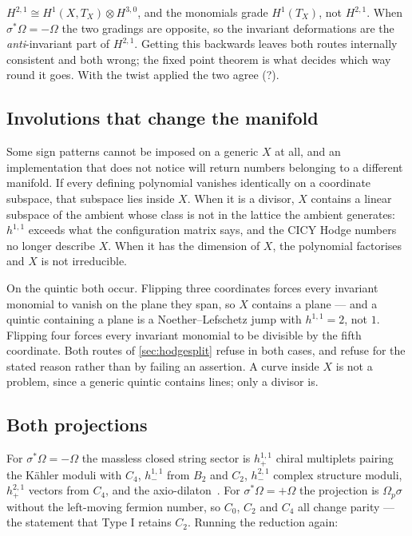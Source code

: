 \documentclass[11pt,a4paper]{article}
\newcommand{\SFQuinticRoutesAgree}{?}\newcommand{\SFQuinticChiral}{?}
\theoremstyle{definition}
\begin{document}
\begin{framed}
\noindent
$H^{2,1} \cong H^1(X, T_X) \otimes H^{3,0}$, and the monomials grade
$H^1(T_X)$, not $H^{2,1}$. When $\sigma^*\Omega = -\Omega$ the two gradings
are opposite, so the invariant deformations are the \emph{anti}-invariant part
of $H^{2,1}$. Getting this backwards leaves both routes internally consistent
and both wrong; the fixed point theorem is what decides which way round it
goes. With the twist applied the two agree (\SFQuinticRoutesAgree).
\end{framed}

\subsection{Involutions that change the manifold}

Some sign patterns cannot be imposed on a generic $X$ at all, and an
implementation that does not notice will return numbers belonging to a
different manifold. If every defining polynomial vanishes identically on a
coordinate subspace, that subspace lies inside $X$. When it is a divisor,
$X$ contains a linear subspace of the ambient whose class is not in the
lattice the ambient generates: $h^{1,1}$ exceeds what the configuration matrix
says, and the CICY Hodge numbers no longer describe $X$. When it has the
dimension of $X$, the polynomial factorises and $X$ is not irreducible.

On the quintic both occur. Flipping three coordinates forces every invariant
monomial to vanish on the plane they span, so $X$ contains a plane --- and a
quintic containing a plane is a Noether--Lefschetz jump with $h^{1,1} = 2$,
not $1$. Flipping four forces every invariant monomial to be divisible by the
fifth coordinate. Both routes of \cref{sec:hodgesplit} refuse in both cases,
and refuse for the stated reason rather than by failing an assertion. A curve
inside $X$ is not a problem, since a generic quintic contains lines; only a
divisor is.

\subsection{Both projections}

For $\sigma^*\Omega = -\Omega$ the massless closed string sector is
$h^{1,1}_+$ chiral multiplets pairing the K\"ahler moduli with $C_4$,
$h^{1,1}_-$ from $B_2$ and $C_2$, $h^{2,1}_-$ complex structure moduli,
$h^{2,1}_+$ vectors from $C_4$, and the axio-dilaton~\cite{GrimmLouis2004}.
For $\sigma^*\Omega = +\Omega$ the projection is $\Omega_p \sigma$ without the
left-moving fermion number, so $C_0$, $C_2$ and $C_4$ all change parity ---
the statement that Type I retains $C_2$. Running the reduction again:
\end{document}
